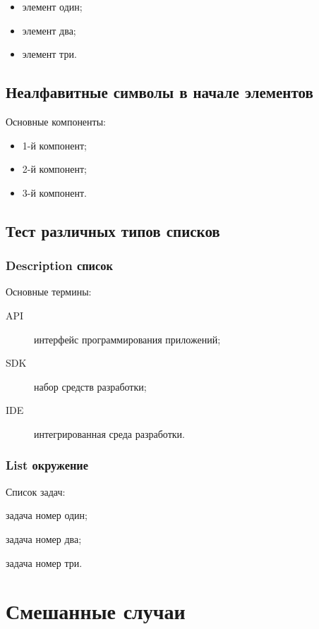 \documentclass{article}
\begin{document}
   
\begin{itemize}
\item элемент один;
\item элемент два;
\item элемент три.
\end{itemize}

\subsection{Неалфавитные символы в начале элементов}

Основные компоненты:
\begin{itemize}
\item 1-й компонент;
\item 2-й компонент;
\item 3-й компонент.
\end{itemize}

\subsection{Тест различных типов списков}

\subsubsection{Description список}

Основные термины:
\begin{description}
\item[API] интерфейс программирования приложений;
\item[SDK] набор средств разработки;
\item[IDE] интегрированная среда разработки.
\end{description}

\subsubsection{List окружение}

Список задач:
\begin{list}{•}{\leftmargin=1cm}
\item задача номер один;
\item задача номер два;
\item задача номер три.
\end{list}

\section{Смешанные случаи}
\end{document}
